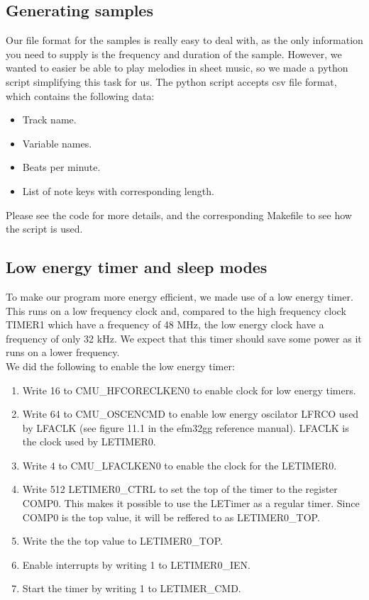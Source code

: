 \subsection{Generating samples}
Our file format for the samples is really easy to deal with, as the only information you need to supply is the frequency and duration of the sample. However, we wanted to easier be able to play melodies in sheet music, so we made a python script simplifying this task for us. The python script accepts csv file format, which contains the following data:
\begin{itemize}
	\item Track name.
	\item Variable names.
	\item Beats per minute.
	\item List of note keys with corresponding length.
\end{itemize}

Please see the code for more details, and the corresponding Makefile to see how the script is used.

\subsection{Low energy timer and sleep modes}

To make our program more energy efficient, we made use of a low energy timer. This runs on a low frequency clock and, compared to the high frequency clock TIMER1 which have a frequency of 48 MHz, the low energy clock have a frequency of only 32 kHz. We expect that this timer should save some power as it runs on a lower frequency. \\

We did the following to enable the low energy timer:

\begin{enumerate}
	\item {Write 16 to CMU\_HFCORECLKEN0 to enable clock for low energy timers.}
	\item {Write 64 to CMU\_OSCENCMD to enable low energy oscilator LFRCO used by LFACLK (see figure 11.1 in the efm32gg reference manual). LFACLK is the clock used by LETIMER0.}
	\item {Write 4 to CMU\_LFACLKEN0 to enable the clock for the LETIMER0.}
	\item {Write 512 LETIMER0\_CTRL to set the top of the timer to the register COMP0. This makes it possible to use the LETimer as a regular timer. Since COMP0 is the top value, it will be reffered to as LETIMER0\_TOP.}
	\item {Write the the top value to LETIMER0\_TOP.}
	\item {Enable interrupts by writing 1 to LETIMER0\_IEN.}
	\item {Start the timer by writing 1 to LETIMER\_CMD.} 
\end{enumerate}

